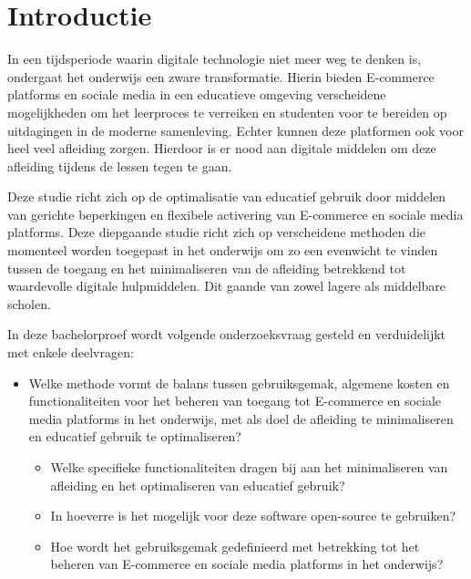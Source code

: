 
\section{Introductie}%
\label{sec:introductie}
In een tijdsperiode waarin digitale technologie niet meer weg te denken is, ondergaat het onderwijs een zware transformatie. Hierin bieden E-commerce platforms en sociale media in een educatieve omgeving verscheidene mogelijkheden om het leerproces te verreiken en studenten voor te bereiden op uitdagingen in de moderne samenleving. Echter kunnen deze platformen ook voor heel veel afleiding zorgen. Hierdoor is er nood aan digitale middelen om deze afleiding tijdens de lessen tegen te gaan. 

Deze studie richt zich op de optimalisatie van educatief gebruik door middelen van gerichte beperkingen en flexibele activering van E-commerce en sociale media platforms. Deze diepgaande studie richt zich op verscheidene methoden die momenteel worden toegepast in het onderwijs om zo een evenwicht te vinden tussen de toegang en het minimaliseren van de afleiding betrekkend tot waardevolle digitale hulpmiddelen. Dit gaande van zowel lagere als middelbare scholen. 

In deze bachelorproef wordt volgende onderzoeksvraag gesteld en verduidelijkt met enkele deelvragen:
\begin{itemize}
    \item Welke methode vormt de balans tussen gebruiksgemak, algemene kosten en functionaliteiten voor het beheren van toegang tot E-commerce en sociale media platforms in het onderwijs, met als doel de afleiding te minimaliseren en educatief gebruik te optimaliseren? 
    \begin{itemize}
       \item Welke specifieke functionaliteiten dragen bij aan het minimaliseren van afleiding en het optimaliseren van educatief gebruik?
       \item In hoeverre is het mogelijk voor deze software open-source te gebruiken?
       \item Hoe wordt het gebruiksgemak gedefinieerd met betrekking tot het beheren van E-commerce en sociale media platforms in het onderwijs?    
     \end{itemize}
\end{itemize}



